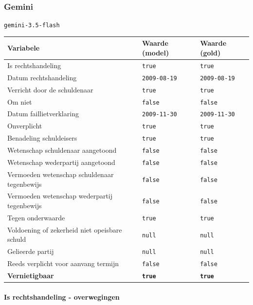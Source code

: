 \documentclass[
  dutch,
  a4paper,
]{article}
\begin{document}
\newpage


\subsubsection{Gemini}\label{gemini-21}

\texttt{gemini-3.5-flash}

\begin{center}
\small
\begin{tabular}{@{}p{7.4cm}p{2.6cm}p{2.6cm}@{}}
\toprule
Variabele & Waarde (model) & Waarde (gold) \\
\midrule
Is rechtshandeling & \texttt{true} & \texttt{true} \\
Datum rechtshandeling & \texttt{2009-08-19} & \texttt{2009-08-19} \\
Verricht door de schuldenaar & \texttt{true} & \texttt{true} \\
Om niet & \texttt{false} & \texttt{false} \\
Datum faillietverklaring & \texttt{2009-11-30} & \texttt{2009-11-30} \\
Onverplicht & \texttt{true} & \texttt{true} \\
Benadeling schuldeisers & \texttt{true} & \texttt{true} \\
Wetenschap schuldenaar aangetoond & \texttt{false} & \texttt{false} \\
Wetenschap wederpartij aangetoond & \texttt{false} & \texttt{false} \\
Vermoeden wetenschap schuldenaar tegenbewijs & \texttt{false} & \texttt{false} \\
Vermoeden wetenschap wederpartij tegenbewijs & \texttt{false} & \texttt{false} \\
Tegen onderwaarde & \texttt{true} & \texttt{true} \\
Voldoening of zekerheid niet opeisbare schuld & \texttt{null} & \texttt{null} \\
Gelieerde partij & \texttt{null} & \texttt{null} \\
Reeds verplicht voor aanvang termijn & \texttt{false} & \texttt{false} \\
\textbf{Vernietigbaar} & \textbf{\texttt{true}} & \textbf{\texttt{true}} \\
\bottomrule
\end{tabular}
\end{center}

\paragraph{Is rechtshandeling - overwegingen}\label{is-rechtshandeling---overwegingen-65}
\end{document}
